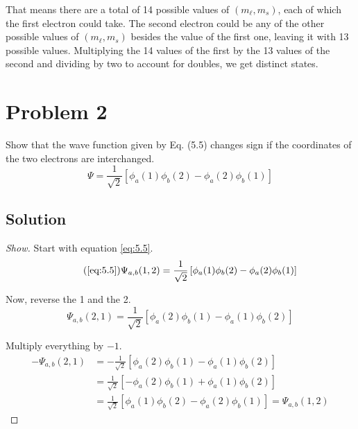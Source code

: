 \documentclass[12pt]{article}
\newcommand{\tagref}[1]{\tag{\ref{#1}}}
\begin{document}
            That means there are a total of 14 possible values of $(m_\ell, m_s)$, each of which the first electron could take.
            The second electron could be any of the other possible values of $(m_\ell, m_s)$ besides the value of the first one, leaving it with 13 possible values.
            Multiplying the 14 values of the first by the 13 values of the second and dividing by two to account for doubles, we get  distinct states.
        \pagebreak

    \section{Problem 2}
        Show that the wave function given by Eq. (5.5) changes sign if the coordinates of the two electrons are interchanged.
        \begin{equation}
            \label{eq:5.5} \tag{5.5}
            \Psi = \frac{1}{\sqrt{2}} \left[ \phi_a(1) \phi_b(2) - \phi_a(2) \phi_b(1) \right]
        \end{equation}

        \subsection{Solution}
            \begin{proof}[Show]
                Start with equation \ref{eq:5.5}.
                \begin{equation}\tagref{eq:5.5}
                    \Psi_{a,b}(1,2) = \frac{1}{\sqrt{2}} \left[ \phi_a(1) \phi_b(2) - \phi_a(2) \phi_b(1) \right]            
                \end{equation}

                Now, reverse the 1 and the 2.
                \begin{equation}
                    \Psi_{a,b}(2,1) = \frac{1}{\sqrt{2}} \left[ \phi_a(2) \phi_b(1) - \phi_a(1) \phi_b(2) \right]
                \end{equation}

                Multiply everything by $-1$.
                \begin{align}
                    -\Psi_{a,b}(2,1)    &=  -\frac{1}{\sqrt{2}} \left[ \phi_a(2) \phi_b(1) - \phi_a(1) \phi_b(2) \right]\\
                        &=  \frac{1}{\sqrt{2}} \left[ -\phi_a(2) \phi_b(1) + \phi_a(1) \phi_b(2) \right]\\
                        &=  \frac{1}{\sqrt{2}} \left[ \phi_a(1) \phi_b(2) - \phi_a(2) \phi_b(1) \right]
                        =   \Psi_{a,b}(1,2)
                \end{align}
            \end{proof}
    \pagebreak
            
\end{document}
